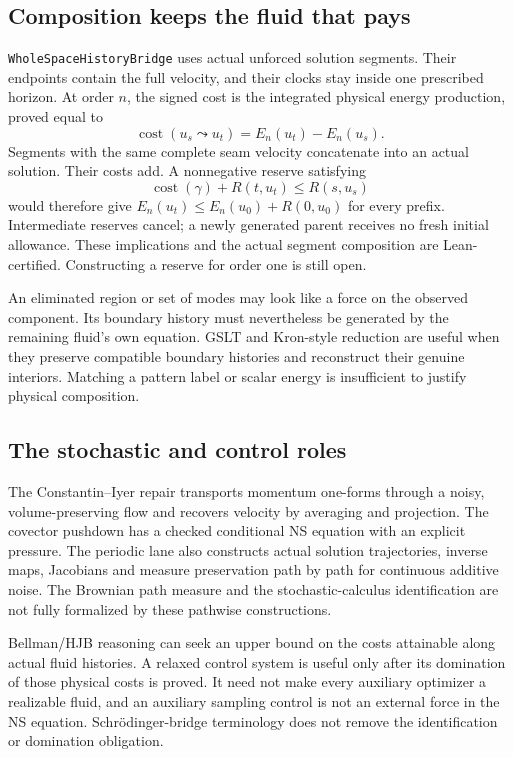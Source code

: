 \documentclass[11pt]{article}
\theoremstyle{definition}
\begin{document}
\subsection{Composition keeps the fluid that pays}

\texttt{WholeSpaceHistoryBridge} uses actual unforced solution segments.
Their endpoints contain the full velocity, and their clocks stay inside one
prescribed horizon. At order $n$, the signed cost is the integrated physical
energy production, proved equal to
\[
 \operatorname{cost}(u_s\leadsto u_t)=E_n(u_t)-E_n(u_s).
\]
Segments with the same complete seam velocity concatenate into an actual
solution. Their costs add. A nonnegative reserve satisfying
\[
 \operatorname{cost}(\gamma)+R(t,u_t)\le R(s,u_s)
\]
would therefore give $E_n(u_t)\le E_n(u_0)+R(0,u_0)$ for every prefix.
Intermediate reserves cancel; a newly generated parent receives no fresh
initial allowance. These implications and the actual segment composition
are Lean-certified. Constructing a reserve for order one is still open.

An eliminated region or set of modes may look like a force on the observed
component. Its boundary history must nevertheless be generated by the
remaining fluid's own equation. GSLT and Kron-style reduction are useful when
they preserve compatible boundary histories and reconstruct their genuine
interiors. Matching a pattern label or scalar energy is insufficient to
justify physical composition.

\subsection{The stochastic and control roles}

The Constantin--Iyer repair transports momentum one-forms through a noisy,
volume-preserving flow and recovers velocity by averaging and projection.
The covector pushdown has a checked conditional NS equation with an explicit
pressure. The periodic lane also constructs actual solution trajectories,
inverse maps, Jacobians and measure preservation path by path for continuous
additive noise. The Brownian path measure and the stochastic-calculus
identification are not fully formalized by these pathwise constructions.

Bellman/HJB reasoning can seek an upper bound on the costs attainable along
actual fluid histories. A relaxed control system is useful only after its
domination of those physical costs is proved. It need not make every auxiliary
optimizer a realizable fluid, and an auxiliary sampling control is not an
external force in the NS equation. Schr\"odinger-bridge terminology does not
remove the identification or domination obligation.
\end{document}

